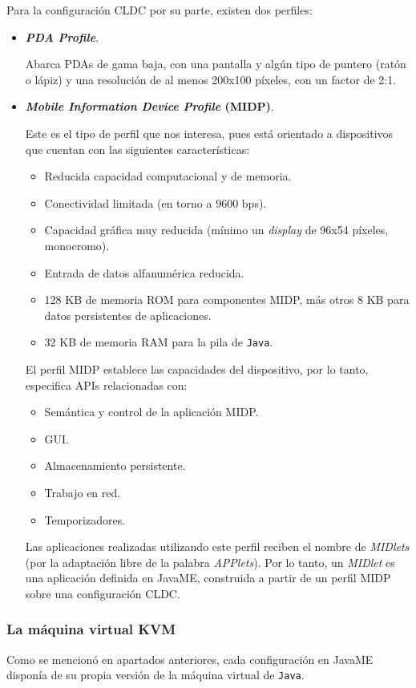 Para la configuración \acs{CLDC} por su parte, existen dos perfiles:
\begin{itemize}
\item \textbf{\emph{PDA Profile}}.

Abarca \acs{PDA}s de gama baja, con una pantalla y algún tipo de puntero
(ratón o lápiz) y una resolución de al menos 200x100 píxeles, con un factor
de 2:1.

\item \textbf{\emph{Mobile Information Device Profile} (\acs{MIDP})}.

Este es el tipo de perfil que nos interesa, pues está orientado a dispositivos 
que cuentan con las siguientes características:
\begin{itemize}
\item Reducida capacidad computacional y de memoria.
\item Conectividad limitada (en torno a 9600 bps).
\item Capacidad gráfica muy reducida (mínimo un \emph{display} de 96x54
píxeles, monocromo).
\item Entrada de datos alfanumérica reducida.
\item 128 KB de memoria \acs{ROM} para componentes \acs{MIDP}, más otros
8 KB para datos persistentes de aplicaciones.
\item 32 KB de memoria \acs{RAM} para la pila de \texttt{Java}.
\end{itemize}

El perfil \acs{MIDP} establece las capacidades del dispositivo, por lo tanto,
especifica \acs{API}s relacionadas con:
\begin{itemize}
\item Semántica y control de la aplicación \acs{MIDP}.
\item \acs{GUI}.
\item Almacenamiento persistente.
\item Trabajo en red.
\item Temporizadores.
\end{itemize}

Las aplicaciones realizadas utilizando este perfil reciben el nombre de
\emph{MIDlets} (por la adaptación libre de la palabra \emph{APPlets}). Por
lo tanto, un \emph{MIDlet} es una aplicación definida en \acs{JavaME},
construida a partir de un perfil \acs{MIDP} sobre una configuración
\acs{CLDC}.
\end{itemize}

\subsubsection{La máquina virtual \acs{KVM}}
Como se mencionó en apartados anteriores, cada configuración en \acs{JavaME}
disponía de su propia versión de la máquina virtual de \texttt{Java}.

